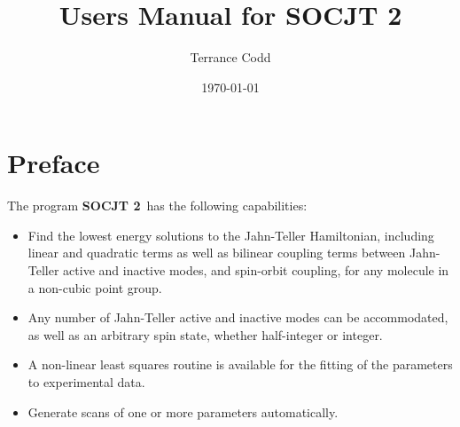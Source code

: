 \documentclass{article}
\newcommand{\socjttwo}{{\bf SOCJT 2}}
\newenvironment{bulletlist}{%
  \renewcommand{\labelitemi}{$\bullet $}%
     \begin{itemize}}{\end{itemize}}
\begin{document}
\author{Terrance Codd}
\title{Users Manual for \socjttwo}

\date{\today}

\maketitle

\tableofcontents
\newpage

\setcounter{section}{-1}
\section{Preface} \label{section:preface}

The program \socjttwo\ has the following
capabilities: 
\begin{bulletlist}
\item Find the lowest energy solutions to the Jahn-Teller Hamiltonian, including linear and quadratic terms as well as bilinear coupling terms between Jahn-Teller active and inactive modes, and spin-orbit coupling, for any molecule in a non-cubic point group.
\item Any number of Jahn-Teller active and inactive modes can be accommodated, as well as an arbitrary spin state, whether half-integer or integer.
\item A non-linear least squares routine is available for the fitting of the parameters to experimental data.
\item Generate scans of one or more parameters automatically.
\end{bulletlist}
\end{document}
